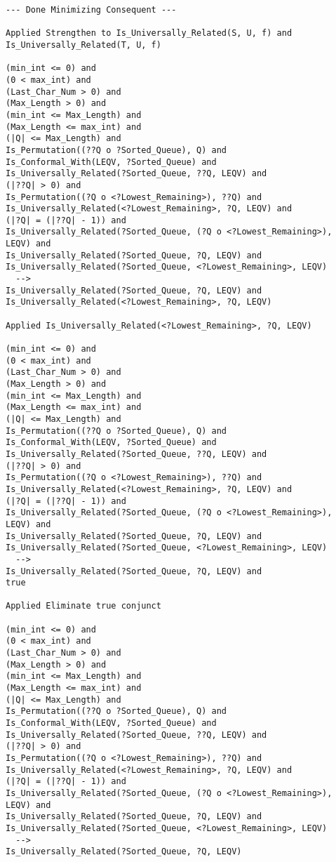 \begin{lstlisting}[language=resolve]
--- Done Minimizing Consequent ---

Applied Strengthen to Is_Universally_Related(S, U, f) and Is_Universally_Related(T, U, f)

(min_int <= 0) and
(0 < max_int) and
(Last_Char_Num > 0) and
(Max_Length > 0) and
(min_int <= Max_Length) and
(Max_Length <= max_int) and
(|Q| <= Max_Length) and
Is_Permutation((??Q o ?Sorted_Queue), Q) and
Is_Conformal_With(LEQV, ?Sorted_Queue) and
Is_Universally_Related(?Sorted_Queue, ??Q, LEQV) and
(|??Q| > 0) and
Is_Permutation((?Q o <?Lowest_Remaining>), ??Q) and
Is_Universally_Related(<?Lowest_Remaining>, ?Q, LEQV) and
(|?Q| = (|??Q| - 1)) and
Is_Universally_Related(?Sorted_Queue, (?Q o <?Lowest_Remaining>), LEQV) and
Is_Universally_Related(?Sorted_Queue, ?Q, LEQV) and
Is_Universally_Related(?Sorted_Queue, <?Lowest_Remaining>, LEQV)
  -->
Is_Universally_Related(?Sorted_Queue, ?Q, LEQV) and
Is_Universally_Related(<?Lowest_Remaining>, ?Q, LEQV)

Applied Is_Universally_Related(<?Lowest_Remaining>, ?Q, LEQV)

(min_int <= 0) and
(0 < max_int) and
(Last_Char_Num > 0) and
(Max_Length > 0) and
(min_int <= Max_Length) and
(Max_Length <= max_int) and
(|Q| <= Max_Length) and
Is_Permutation((??Q o ?Sorted_Queue), Q) and
Is_Conformal_With(LEQV, ?Sorted_Queue) and
Is_Universally_Related(?Sorted_Queue, ??Q, LEQV) and
(|??Q| > 0) and
Is_Permutation((?Q o <?Lowest_Remaining>), ??Q) and
Is_Universally_Related(<?Lowest_Remaining>, ?Q, LEQV) and
(|?Q| = (|??Q| - 1)) and
Is_Universally_Related(?Sorted_Queue, (?Q o <?Lowest_Remaining>), LEQV) and
Is_Universally_Related(?Sorted_Queue, ?Q, LEQV) and
Is_Universally_Related(?Sorted_Queue, <?Lowest_Remaining>, LEQV)
  -->
Is_Universally_Related(?Sorted_Queue, ?Q, LEQV) and
true

Applied Eliminate true conjunct

(min_int <= 0) and
(0 < max_int) and
(Last_Char_Num > 0) and
(Max_Length > 0) and
(min_int <= Max_Length) and
(Max_Length <= max_int) and
(|Q| <= Max_Length) and
Is_Permutation((??Q o ?Sorted_Queue), Q) and
Is_Conformal_With(LEQV, ?Sorted_Queue) and
Is_Universally_Related(?Sorted_Queue, ??Q, LEQV) and
(|??Q| > 0) and
Is_Permutation((?Q o <?Lowest_Remaining>), ??Q) and
Is_Universally_Related(<?Lowest_Remaining>, ?Q, LEQV) and
(|?Q| = (|??Q| - 1)) and
Is_Universally_Related(?Sorted_Queue, (?Q o <?Lowest_Remaining>), LEQV) and
Is_Universally_Related(?Sorted_Queue, ?Q, LEQV) and
Is_Universally_Related(?Sorted_Queue, <?Lowest_Remaining>, LEQV)
  -->
Is_Universally_Related(?Sorted_Queue, ?Q, LEQV)


\end{lstlisting}
